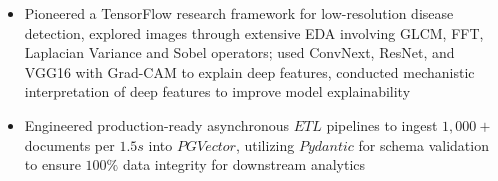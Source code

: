 \documentclass[10pt]{article}
\begin{document}
\begin{itemize}[left=0pt, itemsep=0pt]
    \item Pioneered a TensorFlow research framework for low-resolution disease detection, explored images through extensive EDA involving GLCM, FFT, Laplacian Variance and Sobel operators; used ConvNext, ResNet, and VGG16 with Grad-CAM to explain deep features, conducted mechanistic interpretation of deep features to improve model explainability
    \item Engineered production-ready asynchronous $ETL$ pipelines to ingest $1,000+$ documents per $1.5s$ into $PGVector$, utilizing $Pydantic$ for schema validation to ensure $100\%$ data integrity for downstream analytics

\end{itemize}
\end{document}
